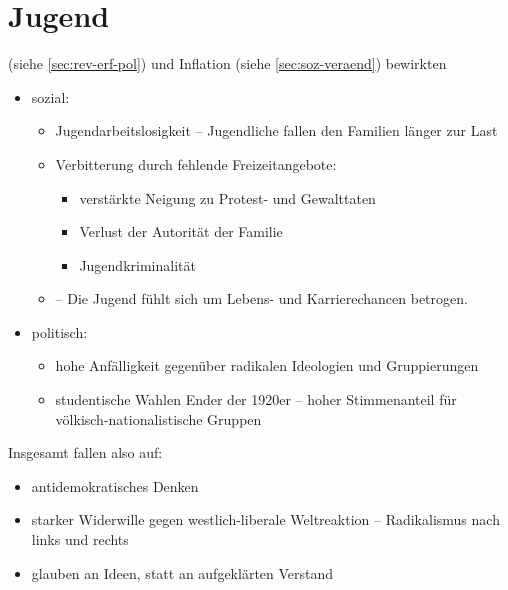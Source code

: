 \section{Jugend}

 (siehe \ref{sec:rev-erf-pol}) und
Inflation (siehe \ref{sec:soz-veraend})
bewirkten

\begin{itemize}
\item sozial:

\begin{itemize}
\item Jugendarbeitslosigkeit -- Jugendliche fallen den Familien länger
zur Last
\item Verbitterung durch fehlende Freizeitangebote:

\begin{itemize}
\item verstärkte Neigung zu Protest- und Gewalttaten 
\item Verlust der Autorität der Familie
\item Jugendkriminalität
\end{itemize}

\item {} -- Die Jugend fühlt sich um Lebens-
und Karrierechancen betrogen.
\end{itemize}

\item politisch:

\begin{itemize}
\item hohe Anfälligkeit gegenüber radikalen Ideologien und
Gruppierungen
\item studentische Wahlen Ender der 1920er -- hoher
Stimmenanteil für völkisch-nationalistische Gruppen
\end{itemize}
\end{itemize}

Insgesamt fallen also auf:

\begin{itemize}
\item antidemokratisches Denken
\item starker Widerwille gegen westlich-liberale Weltreaktion 
-- Radikalismus nach links und rechts
\item glauben an Ideen, statt an aufgeklärten Verstand
\end{itemize}

\endinput
